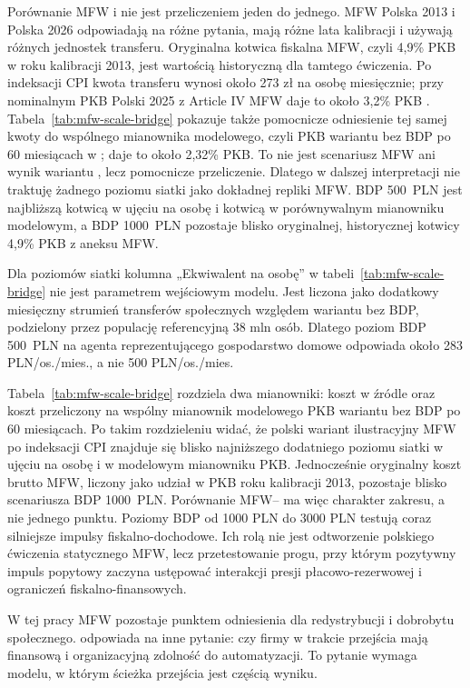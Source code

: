 Porównanie MFW i \amor{} nie jest przeliczeniem jeden do jednego. MFW Polska 2013 i \amor{} Polska 2026 odpowiadają na różne pytania, mają różne lata kalibracji i używają różnych jednostek transferu. Oryginalna kotwica fiskalna MFW, czyli 4,9\% PKB w roku kalibracji 2013, jest wartością historyczną dla tamtego ćwiczenia. Po indeksacji CPI kwota transferu wynosi około 273 zł na osobę miesięcznie; przy nominalnym PKB Polski 2025 z Article IV MFW daje to około 3,2\% PKB \parencite{imf2026polandArticleIV}. Tabela~\ref{tab:mfw-scale-bridge} pokazuje także pomocnicze odniesienie tej samej kwoty do wspólnego mianownika modelowego, czyli PKB wariantu bez BDP po 60 miesiącach w \amor{}; daje to około 2,32\% PKB. To nie jest scenariusz MFW ani wynik wariantu \amor{}, lecz pomocnicze przeliczenie. Dlatego w dalszej interpretacji nie traktuję żadnego poziomu siatki jako dokładnej repliki MFW. BDP 500~PLN jest najbliższą kotwicą w ujęciu na osobę i kotwicą w porównywalnym mianowniku modelowym, a BDP 1000~PLN pozostaje blisko oryginalnej, historycznej kotwicy 4,9\% PKB z aneksu MFW.

Dla poziomów siatki \amor{} kolumna „Ekwiwalent na osobę” w tabeli~\ref{tab:mfw-scale-bridge} nie jest parametrem wejściowym modelu. Jest liczona jako dodatkowy miesięczny strumień transferów społecznych względem wariantu bez BDP, podzielony przez populację referencyjną 38 mln osób. Dlatego poziom BDP 500~PLN na agenta reprezentującego gospodarstwo domowe odpowiada około 283 PLN/os./mies., a nie 500 PLN/os./mies.



Tabela~\ref{tab:mfw-scale-bridge} rozdziela dwa mianowniki: koszt w źródle oraz koszt przeliczony na wspólny mianownik modelowego PKB wariantu bez BDP po 60 miesiącach. Po takim rozdzieleniu widać, że polski wariant ilustracyjny MFW po indeksacji CPI znajduje się blisko najniższego dodatniego poziomu siatki \amor{} w ujęciu na osobę i w modelowym mianowniku PKB. Jednocześnie oryginalny koszt brutto MFW, liczony jako udział w PKB roku kalibracji 2013, pozostaje blisko scenariusza BDP 1000~PLN. Porównanie MFW--\amor{} ma więc charakter zakresu, a nie jednego punktu. Poziomy BDP od 1000 PLN do 3000 PLN testują coraz silniejsze impulsy fiskalno-dochodowe. Ich rolą nie jest odtworzenie polskiego ćwiczenia statycznego MFW, lecz przetestowanie progu, przy którym pozytywny impuls popytowy zaczyna ustępować interakcji presji płacowo-rezerwowej i ograniczeń fiskalno-finansowych.



W tej pracy MFW pozostaje punktem odniesienia dla redystrybucji i dobrobytu społecznego. \amor{} odpowiada na inne pytanie: czy firmy w trakcie przejścia mają finansową i organizacyjną zdolność do automatyzacji. To pytanie wymaga modelu, w którym ścieżka przejścia jest częścią wyniku.
